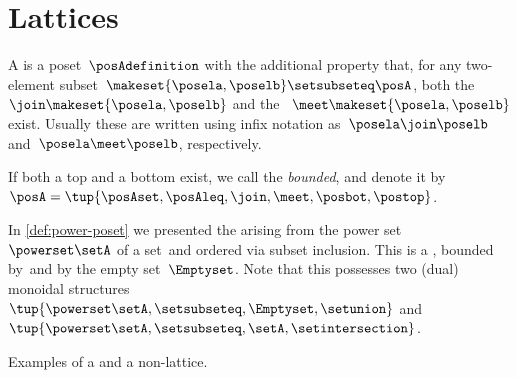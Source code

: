 
\section{Lattices}


\begin{definition}[Lattice]
    \label{def:lattice}
    A  is a poset~$\posAdefinition$ with the additional property that, for any two-element subset~$\makeset{\posela, \poselb} \setsubseteq \posA$, both the ~$\join \makeset{\posela, \poselb}$ and the ~$\meet \makeset{\posela, \poselb }$ exist.
    Usually these are written using infix notation as~$\posela \join \poselb$ and~$\posela \meet \poselb$, respectively.
\end{definition}

\begin{marginfigure}
    \centering
    \caption{}
    \label{fig:lattice-wood}
\end{marginfigure}

\begin{definition}
    \label{def:bounded-lattice}
    If both a top and a bottom exist, we call the  \emph{bounded}, and denote it
    by~$\posA = \tup{\posAset,{{\posAleq}},{{\join}},{{\meet}},\posbot,\postop}$.
\end{definition}

\begin{example}
    In \cref{def:power-poset} we presented the  arising from the power set~$\powerset \setA$ of a set~\setA and ordered via subset inclusion.
    This is a , bounded by~\setA and by the empty set~$\Emptyset$.
    Note that this  possesses two (dual) monoidal structures~$\tup{\powerset \setA,{{\setsubseteq}},\Emptyset,{{\setunion}}}$ and~$\tup{\powerset \setA,{{\setsubseteq}},\setA,{{\setintersection}}}$.
\end{example}

\begin{marginfigure}
    \centering

    \caption{Examples of a  and a non-lattice. }
    \label{fig:exlattice}
\end{marginfigure}

